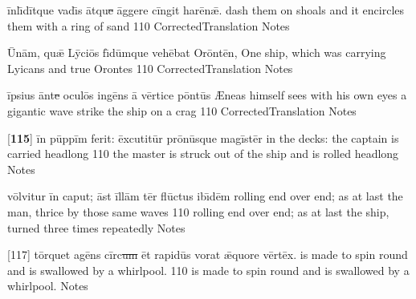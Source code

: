 \latline
  {\=inl\={\macron \i}d\=itqu\-e v\-ad\={\macron \i}s \=atqu\sout{e }\=agg\-er\-e c\=ing\-it h\-ar\={\macron e}n\={\ae}.}
  { dash them on shoals and it encircles them  with a ring of sand }
  {110}
  { CorrectedTranslation }
  { Notes }




\latline
  {\={\macron U}n\=am, qu\={\ae} L\=yci\={\macron o}s f\={\macron \i}d\=umqu\-e v\-eh\={\macron e}b\-at \-Or\=ont\={\macron e}n,}
  { One ship, which was carrying Lyicans and true Orontes }
  {110}
  { CorrectedTranslation }
  { Notes }


\latline
  {\=ips\-i\-us \=ant\sout{e }\-oc\-ul\={\macron o}s ing\={\macron e}ns \={\macron a} v\=ert\-ic\-e p\=ont\=us}
  { {\AE}neas himself sees with his own eyes a gigantic wave strike the ship on a crag  }
  {110}
  { CorrectedTranslation }
  { Notes }


\latline
  {[\textbf{115}] \=in p\=upp\=im fe\-r\-it:  \=exc\-ut\-it\=ur pr\={\macron o}n\=usqu\-e m\-ag\=ist\=er}
  { in the decks: the captain is carried headlong }
  {110}
  { the master is struck out of the ship and is rolled headlong }
  { Notes }




\latline
  {v\=olv\-it\-ur \=in c\-ap\-ut; \=ast \=ill\=am t\=er fl\={\macron u}ct\-us \-ib\={\macron \i}d\=em}
  { rolling end over end; as at last the man, thrice by those same waves  }
  {110}
  { rolling end over end; as at last the ship,  turned three times repeatedly }
  { Notes }


\latline
  {[117] t\=orqu\-et \-ag\={\macron e}ns c\=irc\sout{um }\=et r\-ap\-id\=us v\-or\-at \={\ae}qu\-or\-e v\=ert\=ex.}
  { is made to spin round and is swallowed by a whirlpool. }
  {110}
  { is made to spin round and is swallowed by a whirlpool. }
  { Notes }
